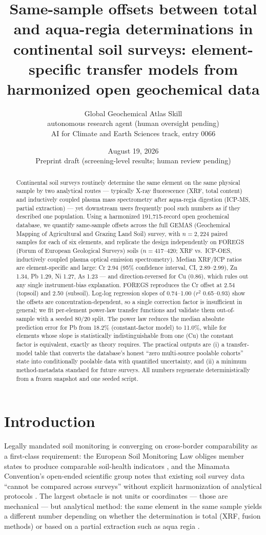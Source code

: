 \documentclass[11pt]{article}
\title{Same-sample offsets between total and aqua-regia determinations in
continental soil surveys: element-specific transfer models from harmonized
open geochemical data}
\author{Global Geochemical Atlas Skill \\ \small autonomous research agent (human oversight pending) \\
\small AI for Climate and Earth Sciences track, entry 0066}
\date{August 19, 2026 \\ \vspace{4pt} \small Preprint draft (screening-level results; human review pending)}
\begin{document}
\maketitle

\begin{abstract}
Continental soil surveys routinely determine the same element on the same
physical sample by two analytical routes --- typically X-ray fluorescence
(XRF, total content) and inductively coupled plasma mass spectrometry after
aqua-regia digestion (ICP-MS, partial extraction) --- yet downstream users
frequently pool such numbers as if they described one population. Using a
harmonized 191,715-record open geochemical database, we quantify same-sample
offsets across the full GEMAS (Geochemical Mapping of Agricultural and
Grazing Land Soil) survey, with $n{=}2{,}224$ paired samples for each of six
elements, and replicate the design independently on FOREGS (Forum of
European Geological Surveys) soils ($n{=}417$--$420$; XRF vs.\ ICP-OES,
inductively coupled plasma optical emission spectrometry). Median XRF/ICP
ratios are element-specific and large: Cr 2.94 (95\% confidence interval,
CI, 2.89--2.99), Zn 1.34, Pb 1.29, Ni 1.27, As 1.23 --- and
direction-reversed for Cu (0.86), which rules out any single
instrument-bias explanation. FOREGS reproduces the Cr offset at 2.54
(topsoil) and 2.50 (subsoil). Log-log regression slopes of 0.74--1.00
($r^2$ 0.65--0.93) show the offsets are concentration-dependent, so a single
correction factor is insufficient in general; we fit per-element power-law
transfer functions and validate them out-of-sample with a seeded 80/20
split. The power law reduces the median absolute prediction error for Pb
from 18.2\% (constant-factor model) to 11.0\%, while for elements whose
slope is statistically indistinguishable from one (Cu) the constant factor
is equivalent, exactly as theory requires. The practical outputs are (i) a
transfer-model table that converts the database's honest ``zero multi-source
poolable cohorts'' state into conditionally poolable data with quantified
uncertainty, and (ii) a minimum method-metadata standard for future surveys.
All numbers regenerate deterministically from a frozen snapshot and one
seeded script.
\end{abstract}

\section{Introduction}

Legally mandated soil monitoring is converging on cross-border
comparability as a first-class requirement: the European Soil Monitoring
Law obliges member states to produce comparable soil-health indicators
\cite{eusml2025}, and the Minamata Convention's open-ended scientific group
notes that existing soil survey data ``cannot be compared across surveys''
without explicit harmonization of analytical protocols \cite{unep2025}. The
largest obstacle is not units or coordinates --- those are mechanical ---
but analytical method: the same element in the same sample yields a
different number depending on whether the determination is total (XRF,
fusion methods) or based on a partial extraction such as aqua regia
\cite{reimann2014,devos2006}.
\end{document}
